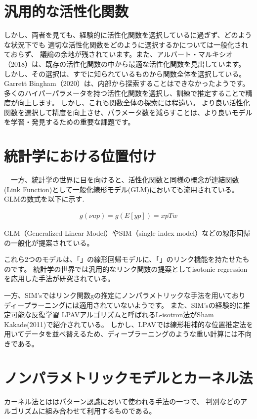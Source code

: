 \section{汎用的な活性化関数}


しかし、両者を見ても、経験的に活性化関数を選択しているに過ぎず、どのような状況下でも 適切な活性化関数をどのように選択するかについては一般化されておらず、
議論の余地が残されています。また、アルバート・マルキシオ（2018）は、既存の活性化関数の中から最適な活性化関数を見出しています。
しかし、その選択は、すでに知られているものから関数全体を選択している。Garrett Bingham（2020）は、内部から探索することはできなかったようです。
多くのハイパーパラメータを持つ活性化関数を選択し、訓練で推定することで精度が向上します。 しかし、これも関数全体の探索には程遠い。
より良い活性化関数を選択して精度を向上させ、パラメータ数を減らすことは、より良いモデルを学習・発見するための重要な課題です。


\section{統計学における位置付け}
　一方、統計学の世界に目を向けると、活性化関数と同様の概念が連結関数(Link Function)として一般化線形モデル(GLM)においても流用されている。
GLMの数式を以下に示す.



\begin{eqnarray}
g( \nu u p ) = g( E[yp] ) = xpTw
\end{eqnarray}

GLM（Generalized Linear Model）やSIM（single index model）などの線形回帰の一般化が提案されている。

これら2つのモデルは、「」の線形回帰モデルに、「」のリンク機能を持たせたものです。 
統計学の世界では汎用的なリンク関数の提案としてisotonic regressionを応用した手法が研究されている。

 一方、SIM'sではリンク関数gの推定にノンパラメトリックな手法を用いており ディープラーニングには適用されていないようです。
 また、SIM'sの経験的に推定可能な反復学習 LPAVアルゴリズムと呼ばれるL-isotron法がSham Kakade(2011)で紹介されている。 
 しかし、LPAVでは線形相補的な位置推定法を用いてデータを並べ替えるため、ディープラーニングのような重い計算には不向きである。 


\section{ノンパラメトリックモデルとカーネル法}

カーネル法とははパターン認識において使われる手法の一つで、 判別などのアルゴリズムに組み合わせて利用するものである。

